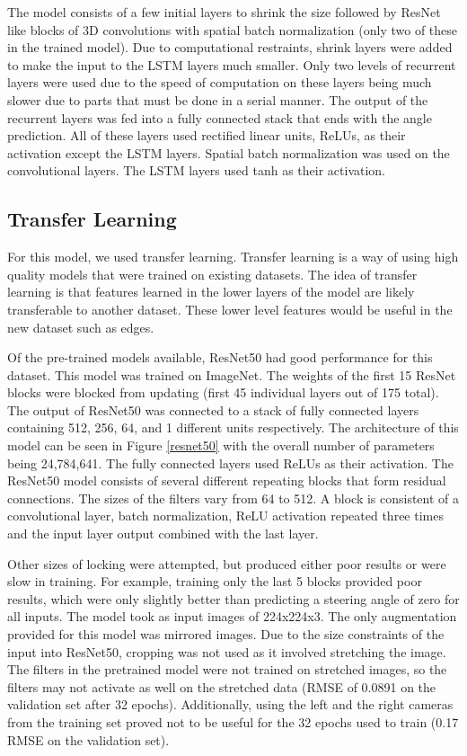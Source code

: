 \documentclass[10pt,twocolumn,letterpaper]{article}
\begin{document}
The model consists of a few initial layers to shrink the size followed by ResNet like blocks of 3D convolutions with spatial batch normalization (only two of these in the trained model). Due to computational restraints, shrink layers were added to make the input to the LSTM layers much smaller. Only two levels of recurrent layers were used due to the speed of computation on these layers being much slower due to parts that must be done in a serial manner. The output of the recurrent layers was fed into a fully connected stack that ends with the angle prediction. All of these layers used rectified linear units, ReLUs, as their activation except the LSTM layers. Spatial batch normalization was used on the convolutional layers. The LSTM layers used tanh as their activation.


\subsection{Transfer Learning}
For this model, we used transfer learning. Transfer learning is a way of using high quality models that were trained on existing datasets. The idea of transfer learning is that features learned in the lower layers of the model are likely transferable to another dataset. These lower level features would be useful in the new dataset such as edges.

Of the pre-trained models available, ResNet50 had good performance for this dataset. This model was trained on ImageNet. The weights of the first 15 ResNet blocks were blocked from updating (first 45 individual layers out of 175 total). The output of ResNet50 was connected to a stack of fully connected layers containing 512, 256, 64, and 1 different units respectively. The architecture of this model can be seen in Figure \ref{resnet50} with the overall number of parameters being 24,784,641. The fully connected layers used ReLUs as their activation. The ResNet50 model consists of several different repeating blocks that form residual connections. The sizes of the filters vary from 64 to 512. A block is consistent of a convolutional layer, batch normalization, ReLU activation repeated three times and the input layer output combined with the last layer.

Other sizes of locking were attempted, but produced either poor results or were slow in training. For example, training only the last 5 blocks provided poor results, which were only slightly better than predicting a steering angle of zero for all inputs. The model took as input images of 224x224x3. The only augmentation provided for this model was mirrored images. Due to the size constraints of the input into ResNet50, cropping was not used as it involved stretching the image. The filters in the pretrained model were not trained on stretched images, so the filters may not activate as well on the stretched data (RMSE of 0.0891 on the validation set after 32 epochs). Additionally, using the left and the right cameras from the training set proved not to be useful for the 32 epochs used to train (0.17 RMSE on the validation set).
\end{document}
